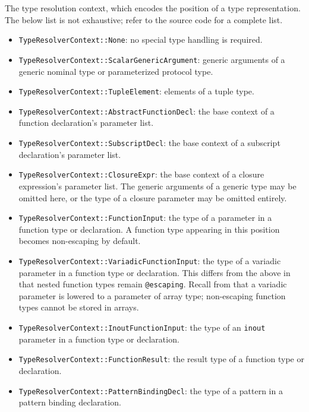 \documentclass[../generics]{subfiles}
\begin{document}
The type resolution context, which encodes the position of a type representation. The below list is not exhaustive; refer to the source code for a complete list.
\begin{itemize}
\item \texttt{TypeResolverContext::None}: no special type handling is required.
\item \texttt{TypeResolverContext::ScalarGenericArgument}: generic arguments of a generic nominal type or parameterized protocol type.
\item \texttt{TypeResolverContext::TupleElement}: elements of a tuple type.
\item \texttt{TypeResolverContext::AbstractFunctionDecl}: the base context of a function declaration's parameter list.
\item \texttt{TypeResolverContext::SubscriptDecl}: the base context of a subscript declaration's parameter list.
\item \texttt{TypeResolverContext::ClosureExpr}: the base context of a closure expression's parameter list. The generic arguments of a generic type may be omitted here, or the type of a closure parameter may be omitted entirely.
\item \texttt{TypeResolverContext::FunctionInput}: the type of a parameter in a function type or declaration. A function type appearing in this position becomes non-escaping by default.
\item \texttt{TypeResolverContext::VariadicFunctionInput}: the type of a variadic parameter in a function type or declaration. This differs from the above in that nested function types remain \texttt{@escaping}. Recall from  that a variadic parameter is lowered to a parameter of array type; non-escaping function types cannot be stored in arrays.
\item \texttt{TypeResolverContext::InoutFunctionInput}: the type of an \texttt{inout} parameter in a function type or declaration.
\item \texttt{TypeResolverContext::FunctionResult}: the result type of a function type or declaration.
\item \texttt{TypeResolverContext::PatternBindingDecl}: the type of a pattern in a pattern binding declaration.

\end{itemize}
\end{document}

